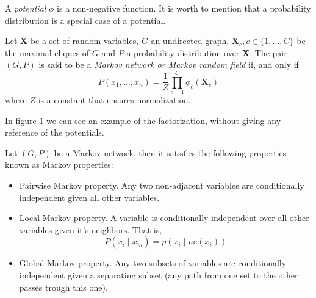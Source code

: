 
\begin{definition}
A \emph{potential} \(\phi\) is a non-negative function. It is worth to mention
that a probability distribution is a special case of a potential.
\end{definition}

\begin{definition}
Let \(\bm{X}\) be a set of random variables, \(G\) an undirected graph,
\(\bm{X}_c, c \in \{1,\dots,C\}\) be the maximal cliques of \(G\) and \(P\) a
probability distribution over \(\bm{X}\). The pair \((G,
P)\) is said to be a \emph{Markov network or Markov random field} if, and only if
\[
P(x_1,\dots,x_n) = \frac{1}{Z}\prod_{ c = 1 }^{C}\phi_c(\bm{X}_c)
\]
where \(Z\) is a constant that ensures normalization.
\end{definition}

\begin{figure}[h]
\centering
{}
\label{fig:mn_example}
\end{figure}


In figure \ref{fig:mn_example} we can see an example of the factorization, without
  giving any reference of the potentials.

  Let \((G,P)\) be a Markov network, then it satisfies the following properties
  known as Markov properties:
  \begin{itemize}
  \item Pairwise Markov property. Any two non-adjacent variables are
    conditionally independent given all other variables.
  \item Local Markov property. A variable is conditionally independent over all
    other variables given it's neighbors. That is,
    \[
      P(x_i \mid x_{\backslash i}) = p(x_i \mid ne(x_i))
    \]
  \item Global Markov property. Any two subsets of variables are conditionally
    independent given a separating subset (any path from one set to the other
    passes trough this one).
  \end{itemize}

